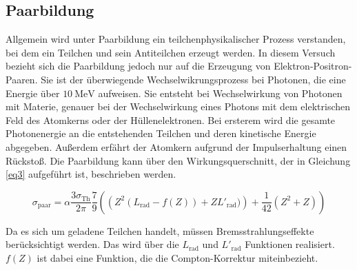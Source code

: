 \subsection{Paarbildung}
Allgemein wird unter Paarbildung ein teilchenphysikalischer Prozess verstanden, bei dem 
ein Teilchen und sein Antiteilchen erzeugt werden. In diesem Versuch bezieht sich die 
Paarbildung jedoch nur auf die Erzeugung von Elektron-Positron-Paaren. 
Sie ist der überwiegende Wechselwikrungsprozess bei Photonen, die eine Energie
über $\SI{10}{\mega\electronvolt}$ aufweisen.
Sie entsteht bei Wechselwirkung von Photonen mit Materie, genauer bei der 
Wechselwirkung eines Photons mit dem elektrischen Feld des Atomkerns oder der 
Hüllenelektronen. 
Bei ersterem wird die gesamte Photonenergie an die 
entstehenden Teilchen und deren kinetische Energie abgegeben. Außerdem erfährt 
der Atomkern aufgrund der Impulserhaltung einen Rückstoß.
Die Paarbildung kann über den 
Wirkungsquerschnitt, der in Gleichung \ref{eq3} aufgeführt ist, beschrieben werden.

\begin{equation}
    \sigma_{\text{paar}} = \alpha \frac{3 \sigma_{\text{Th}}}{2 \pi} \frac{7}{9} \left( \left( Z^2 (L_{\text{rad}} - f(Z)) + Z L'_{\text{rad}}) \right) + \frac{1}{42} \left(Z^2 + Z \right) \right)
    \label{eq3}
\end{equation}

Da es sich um geladene Teilchen handelt, müssen Bremsstrahlungseffekte berücksichtigt 
werden. Das wird über die $L_{\text{rad}}$ und $L'_{\text{rad}}$ Funktionen realisiert. 
$f(Z)$ ist dabei eine Funktion, die die Compton-Korrektur miteinbezieht.

